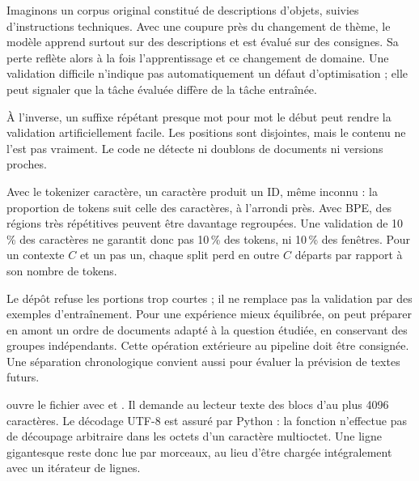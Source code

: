 Imaginons un corpus original constitué de descriptions d'objets, suivies
d'instructions techniques. Avec une coupure près du changement de thème,
le modèle apprend surtout sur des descriptions et est évalué sur des consignes.
Sa perte reflète alors à la fois l'apprentissage et ce changement de domaine.
Une validation difficile n'indique pas automatiquement un défaut d'optimisation ;
elle peut signaler que la tâche évaluée diffère de la tâche entraînée.

À l'inverse, un suffixe répétant presque mot pour mot le début peut rendre
la validation artificiellement facile. Les positions sont disjointes,
mais le contenu ne l'est pas vraiment. Le code ne détecte ni doublons de documents ni versions proches.

Avec le tokenizer caractère, un caractère produit un ID, même inconnu :
la proportion de tokens suit celle des caractères, à l'arrondi près.
Avec BPE, des régions très répétitives peuvent être davantage regroupées.
Une validation de 10\,\% des caractères ne garantit donc pas 10\,\%
des tokens, ni 10\,\% des fenêtres.
Pour un contexte \(C\) et un pas un, chaque split perd en outre \(C\)
départs par rapport à son nombre de tokens.

Le dépôt refuse les portions trop courtes ; il ne remplace pas la validation
par des exemples d'entraînement. Pour une expérience mieux équilibrée,
on peut préparer en amont un ordre de documents adapté à la question étudiée,
en conservant des groupes indépendants. Cette opération extérieure au pipeline doit être consignée.
Une séparation chronologique convient aussi pour évaluer la prévision de textes futurs.


 ouvre le fichier avec 
et . Il demande au lecteur texte des blocs d'au plus
4096 caractères. Le décodage UTF-8 est assuré par Python :
la fonction n'effectue pas de découpage arbitraire dans les octets
d'un caractère multioctet. Une ligne gigantesque reste donc lue
par morceaux, au lieu d'être chargée intégralement avec un itérateur de lignes.

